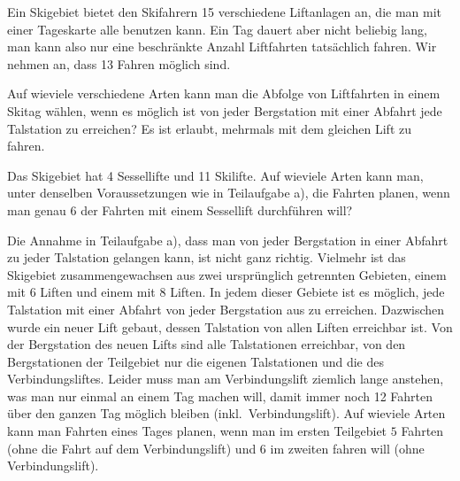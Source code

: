 Ein Skigebiet bietet den Skifahrern 15 verschiedene Liftanlagen an, die
man mit einer Tageskarte alle benutzen kann.
Ein Tag dauert aber nicht beliebig lang, man kann also nur eine beschränkte
Anzahl Liftfahrten tatsächlich fahren.
Wir nehmen an, dass 13 Fahren möglich sind.
\begin{teilaufgaben}
\item
Auf wieviele verschiedene Arten kann man die Abfolge von Liftfahrten
in einem Skitag wählen, wenn es möglich ist von jeder Bergstation mit einer
Abfahrt jede Talstation zu erreichen?
Es ist erlaubt, mehrmals mit dem gleichen Lift zu fahren.
\item
Das Skigebiet hat 4 Sessellifte und 11 Skilifte.
Auf wieviele Arten kann man, unter denselben Voraussetzungen wie
in Teilaufgabe a), die Fahrten planen, wenn man genau 6 der
Fahrten mit einem Sessellift durchführen will?
\item
Die Annahme in Teilaufgabe a), dass man von jeder Bergstation in einer
Abfahrt zu jeder Talstation gelangen kann, ist nicht ganz richtig.
Vielmehr ist das Skigebiet zusammengewachsen aus zwei ursprünglich
getrennten Gebieten, einem mit 6 Liften und einem mit 8 Liften.
In jedem dieser Gebiete ist es möglich, jede Talstation mit einer
Abfahrt von jeder Bergstation aus zu erreichen.
Dazwischen wurde ein neuer Lift gebaut, dessen Talstation von allen
Liften erreichbar ist.
Von der Bergstation des neuen Lifts sind alle Talstationen erreichbar,
von den Bergstationen der Teilgebiet nur die eigenen Talstationen und 
die des Verbindungsliftes.
Leider muss man am Verbindungslift ziemlich lange anstehen, was man nur
einmal an einem Tag machen will, damit immer noch 12 Fahrten über den
ganzen Tag möglich bleiben (inkl.~Verbindungslift).
Auf wieviele Arten kann man Fahrten eines Tages planen, wenn man im ersten
Teilgebiet $5$ Fahrten (ohne die Fahrt auf dem Verbindungslift)
und 6 im zweiten fahren will (ohne Verbindungslift).
\end{teilaufgaben}

